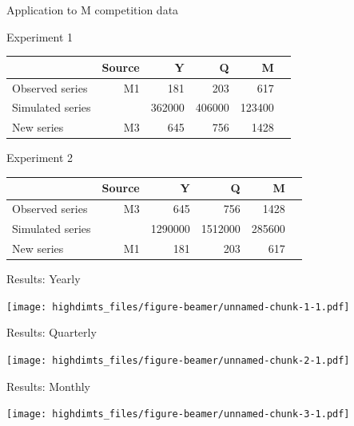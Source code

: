 \documentclass[14pt,ignorenonframetext,]{beamer}
\begin{document}
\begin{frame}{Application to M competition data}
\protect\hypertarget{application-to-m-competition-data}{}

\begin{block}{Experiment 1}
\centering\small\tabcolsep=0.1cm
\begin{tabular}{lrrrrr}
                 & Source & Y      & Q      & M \\
\midrule
Observed series  & M1     & 181    & 203    & 617 \\
Simulated series &        & 362000 & 406000 & 123400 \\
New series       & M3     & 645    & 756    & 1428
\end{tabular}
\end{block}
\begin{block}{Experiment 2}
\centering\small\tabcolsep=0.1cm
\begin{tabular}{lrrrrr}
                 & Source & Y       & Q       & M \\
\midrule
Observed series  & M3     & 645     & 756     & 1428 \\
Simulated series &        & 1290000 & 1512000 & 285600 \\
New series       & M1     & 181     & 203     & 617
\end{tabular}
\end{block}

\end{frame}

\begin{frame}{Results: Yearly}
\protect\hypertarget{results-yearly}{}

\texttt{[image: highdimts\_files/figure-beamer/unnamed-chunk-1-1.pdf]}

\end{frame}

\begin{frame}{Results: Quarterly}
\protect\hypertarget{results-quarterly}{}

\texttt{[image: highdimts\_files/figure-beamer/unnamed-chunk-2-1.pdf]}

\end{frame}

\begin{frame}{Results: Monthly}
\protect\hypertarget{results-monthly}{}

\texttt{[image: highdimts\_files/figure-beamer/unnamed-chunk-3-1.pdf]}

\end{frame}
\end{document}
